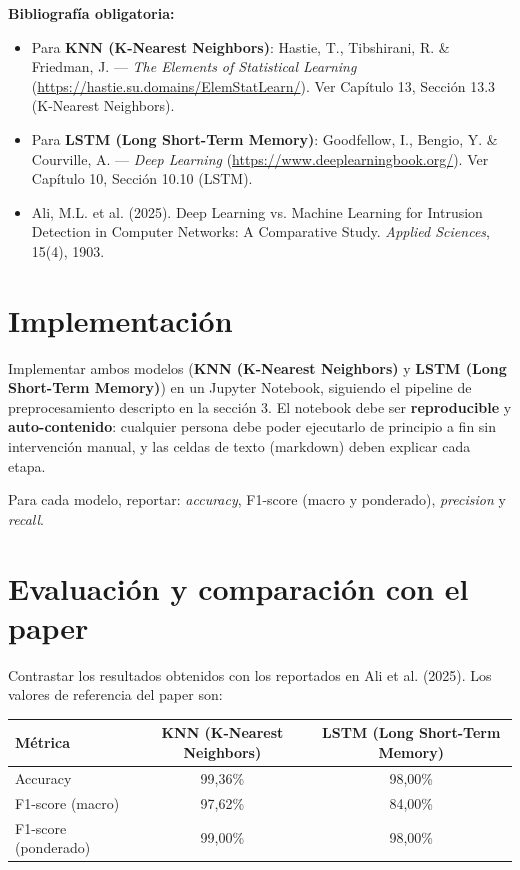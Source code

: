 \documentclass[11pt,a4paper]{article}
\begin{document}
\textbf{Bibliograf\'ia obligatoria:}
\begin{itemize}[leftmargin=2em,itemsep=2pt]
    \item Para \textbf{KNN (K-Nearest Neighbors)}: Hastie, T., Tibshirani, R. \& Friedman, J. --- \textit{The Elements of Statistical Learning} (\url{https://hastie.su.domains/ElemStatLearn/}). Ver Capítulo 13, Sección 13.3 (K-Nearest Neighbors).
    \item Para \textbf{LSTM (Long Short-Term Memory)}: Goodfellow, I., Bengio, Y. \& Courville, A. --- \textit{Deep Learning} (\url{https://www.deeplearningbook.org/}). Ver Capítulo 10, Sección 10.10 (LSTM).
    \item Ali, M.L. et al. (2025). Deep Learning vs. Machine Learning for Intrusion Detection in Computer Networks: A Comparative Study. \textit{Applied Sciences}, 15(4), 1903.
\end{itemize}

\section{Implementaci\'on}
Implementar ambos modelos (\textbf{KNN (K-Nearest Neighbors)} y \textbf{LSTM (Long Short-Term Memory)}) en un Jupyter Notebook, siguiendo el pipeline de preprocesamiento descripto en la secci\'on 3. El notebook debe ser \textbf{reproducible} y \textbf{auto-contenido}: cualquier persona debe poder ejecutarlo de principio a fin sin intervenci\'on manual, y las celdas de texto (markdown) deben explicar cada etapa.

Para cada modelo, reportar: \textit{accuracy}, F1-score (macro y ponderado), \textit{precision} y \textit{recall}.

\section{Evaluaci\'on y comparaci\'on con el paper}
Contrastar los resultados obtenidos con los reportados en Ali et al. (2025). Los valores de referencia del paper son:

\begin{center}
\begin{tabular}{lcc}
        \toprule
        \textbf{M\'etrica} & \textbf{KNN (K-Nearest Neighbors)} & \textbf{LSTM (Long Short-Term Memory)} \\
        \midrule
        Accuracy & 99,36\% & 98,00\% \\
        F1-score (macro) & 97,62\% & 84,00\% \\
        F1-score (ponderado) & 99,00\% & 98,00\% \\
        \bottomrule
\end{tabular}
\end{center}
\end{document}

